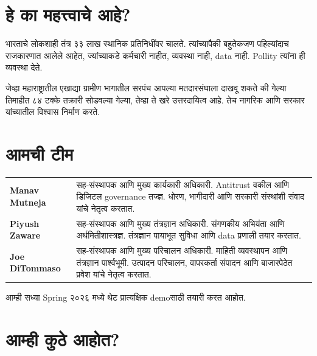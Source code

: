 \documentclass[11pt, a4paper]{article}
\begin{document}
\section{हे का महत्त्वाचे आहे?}

भारताचे लोकशाही तंत्र ३३ लाख स्थानिक प्रतिनिधींवर चालते. त्यांच्यापैकी बहुतेकजण पहिल्यांदाच राजकारणात आलेले आहेत, ज्यांच्याकडे कर्मचारी नाहीत, व्यवस्था नाही, \textenglish{data} नाही. \textenglish{Pollity} त्यांना ही व्यवस्था देते.

जेव्हा महाराष्ट्रातील एखाद्या ग्रामीण भागातील सरपंच आपल्या मतदारसंघाला दाखवू शकते की गेल्या तिमाहीत ८४ टक्के तक्रारी सोडवल्या गेल्या, तेव्हा ते खरे उत्तरदायित्व आहे. तेच नागरिक आणि सरकार यांच्यातील विश्वास निर्माण करते.

\section{आमची टीम}

\begin{tabularx}{\linewidth}{lX}
\toprule
\textbf{\textenglish{Manav Mutneja}} & सह-संस्थापक आणि मुख्य कार्यकारी अधिकारी. \textenglish{Antitrust} वकील आणि डिजिटल \textenglish{governance} तज्ज्ञ. धोरण, भागीदारी आणि सरकारी संस्थांशी संवाद यांचे नेतृत्व करतात. \\[4pt]
\textbf{\textenglish{Piyush Zaware}} & सह-संस्थापक आणि मुख्य तंत्रज्ञान अधिकारी. संगणकीय अभियंता आणि अर्थमितीशास्त्रज्ञ. तंत्रज्ञान पायाभूत सुविधा आणि \textenglish{data} प्रणाली तयार करतात. \\[4pt]
\textbf{\textenglish{Joe DiTommaso}} & सह-संस्थापक आणि मुख्य परिचालन अधिकारी. माहिती व्यवस्थापन आणि तंत्रज्ञान पार्श्वभूमी. उत्पादन परिचालन, वापरकर्ता संपादन आणि बाजारपेठेत प्रवेश यांचे नेतृत्व करतात. \\
\bottomrule
\end{tabularx}

\vspace{0.5em}
आम्ही सध्या \textenglish{Spring} २०२६ मध्ये थेट प्रात्यक्षिक \textenglish{demo}साठी तयारी करत आहोत.

\section{आम्ही कुठे आहोत?}
\end{document}

